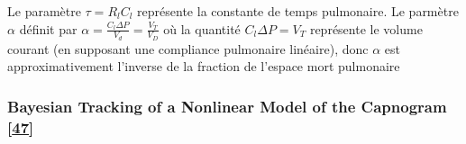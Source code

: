 \documentclass[12pt,]{article}
\begin{document}
Le paramètre \(\tau=R_{l}C_{l}\) représente la constante de temps
pulmonaire. Le parmètre \(\alpha\) définit par
\(\alpha= \frac{C_{l}\Delta P}{V_{d}} =\frac{V_{T}}{V_{D}}\) où la
quantité \(C_{l}\Delta P=V_{T}\) représente le volume courant (en
supposant une compliance pulmonaire linéaire), donc \(\alpha\) est
approximativement l'inverse de la fraction de l'espace mort pulmonaire

\hypertarget{bayesian-tracking-of-a-nonlinear-model-of-the-capnogram-den2006bayesian}{%
\subsubsection{\texorpdfstring{Bayesian Tracking of a Nonlinear Model of
the Capnogram
{[}\protect\hyperlink{ref-den2006bayesian}{47}{]}}{Bayesian Tracking of a Nonlinear Model of the Capnogram {[}47{]}}}\label{bayesian-tracking-of-a-nonlinear-model-of-the-capnogram-den2006bayesian}}
\end{document}
